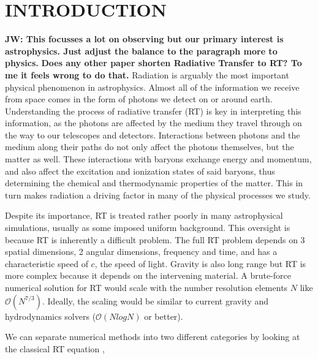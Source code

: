 \documentclass[fleqn,usenatbib]{mnras}
\begin{document}
\section{INTRODUCTION}\label{sec:intro}

{\bf JW: This focusses a lot on observing but our primary interest is astrophysics.  Just adjust the balance to the paragraph more to physics.}
{\bf Does any other paper shorten Radiative Transfer to RT? To me it feels wrong to do that.}
Radiation is arguably the most important physical phenomenon in 
astrophysics. Almost all of the information we receive from space comes 
in the form of photons we detect on or around earth.  Understanding the process 
of radiative transfer (RT) is key in interpreting this information, as the 
photons are affected by the medium they travel through on the way to our 
telescopes and detectors. Interactions between photons and the medium along
 their paths do not only affect the photons themselves, but the matter as well.
 These interactions with baryons exchange energy and momentum, and also affect
 the excitation and ionization states of said baryons, thus determining the 
chemical and thermodynamic properties of the matter. This in turn makes 
radiation a driving factor in many of the physical processes we study.

Despite its importance, RT is treated rather poorly in many
 astrophysical simulations, usually as some imposed uniform background. This oversight 
is because RT is inherently a difficult problem. 
The full RT problem depends on 3 spatial dimensions, 2 
angular dimensions, frequency and time, and has a characteristic speed of $c$, 
the speed of light.  Gravity is also long range but RT is more complex because
 it depends on the intervening material.  A brute-force
numerical solution for RT would scale with the number resolution elements $N$ 
like $\mathcal{O}(N^{7/3})$.  Ideally, the scaling would be similar to current gravity and hydrodynamics
solvers ($\mathcal{O}(NlogN)$ or better).

We can separate numerical methods into two different
categories by looking at the classical RT equation 
\citep{mihalasMihalas84},
\end{document}
